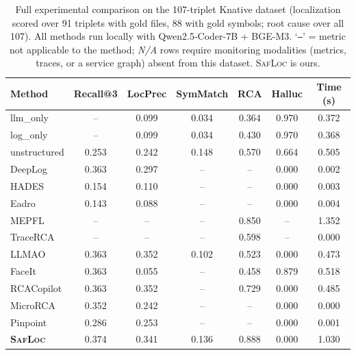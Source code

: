 \begin{table}[t]
  \centering
  \caption{Full experimental comparison on the 107-triplet Knative dataset (localization scored over 91 triplets with gold files, 88 with gold symbols; root cause over all 107). All methods run locally with Qwen2.5-Coder-7B + BGE-M3. `\texttt{--}' = metric not applicable to the method; \emph{N/A} rows require monitoring modalities (metrics, traces, or a service graph) absent from this dataset. \textsc{SafLoc} is ours.}
  \label{tab:fullresults}
  \setlength{\tabcolsep}{5pt}
  \begin{tabular}{lcccccc}
    \toprule
    Method & Recall@3 & LocPrec & SymMatch & RCA & Halluc & Time (s) \\
    \midrule
    llm\_only & -- & 0.099 & 0.034 & 0.364 & 0.970 & 0.372 \\
    log\_only & -- & 0.099 & 0.034 & 0.430 & 0.970 & 0.368 \\
    unstructured & 0.253 & 0.242 & 0.148 & 0.570 & 0.664 & 0.505 \\
    DeepLog & 0.363 & 0.297 & -- & -- & 0.000 & 0.002 \\
    HADES & 0.154 & 0.110 & -- & -- & 0.000 & 0.003 \\
    Eadro & 0.143 & 0.088 & -- & -- & 0.000 & 0.004 \\
    MEPFL & -- & -- & -- & 0.850 & -- & 1.352 \\
    TraceRCA & -- & -- & -- & 0.598 & -- & 0.000 \\
    LLMAO & 0.363 & 0.352 & 0.102 & 0.523 & 0.000 & 0.473 \\
    FaceIt & 0.363 & 0.055 & -- & 0.458 & 0.879 & 0.518 \\
    RCACopilot & 0.363 & 0.352 & -- & 0.729 & 0.000 & 0.485 \\
    MicroRCA & 0.352 & 0.242 & -- & -- & 0.000 & 0.000 \\
    Pinpoint & 0.286 & 0.253 & -- & -- & 0.000 & 0.001 \\
    \midrule
    \textbf{\textsc{SafLoc}} & 0.374 & 0.341 & 0.136 & 0.888 & 0.000 & 1.030 \\
    \bottomrule
  \end{tabular}
\end{table}
